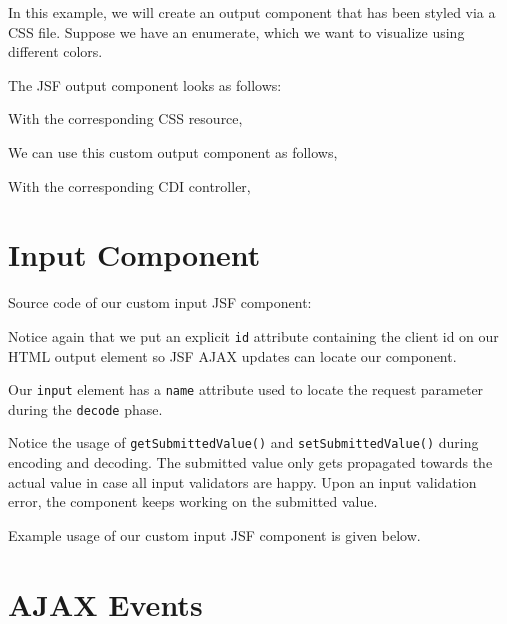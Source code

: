 In this example, we will create an output component that has been styled via a CSS file.
Suppose we have an enumerate, which we want to visualize using different colors.


The JSF output component looks as follows:


With the corresponding CSS resource,


We can use this custom output component as follows,


With the corresponding CDI controller,



\section{Input Component}

Source code of our custom input JSF component:


Notice again that we put an explicit \texttt{id} attribute containing the client id on our HTML output element so JSF AJAX updates can locate our component.

Our \texttt{input} element has a \texttt{name} attribute used to locate the request parameter during the \texttt{decode} phase.

Notice the usage of \texttt{getSubmittedValue()} and \texttt{setSubmittedValue()} during encoding and decoding.
The submitted value only gets propagated towards the actual value in case all input validators are happy.
Upon an input validation error, the component keeps working on the submitted value.

Example usage of our custom input JSF component is given below.


\section{AJAX Events}

